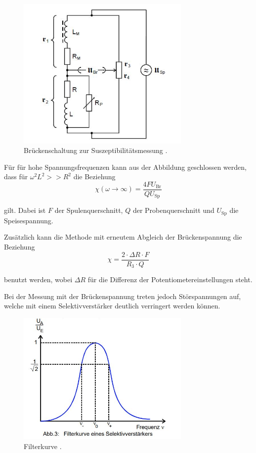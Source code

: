 \begin{figure}[H]
        \centering
        \includegraphics[width=0.75\textwidth]{Bilder/MessBruecke.JPG}
        \caption{Brückenschaltung zur Suszeptibilitätsmessung \cite{V606}.}
        \label{fig:bruecke}
\end{figure}

\noindent
Für für hohe Spannungsfrequenzen kann aus der Abbildung geschlossen werden, dass für $\omega^2 L^2 >> R^2$ die Beziehung 
\begin{equation}
    \chi (\omega \to \infty) = \frac{4 F U_\text{Br}}{Q U_\text{Sp}} 
    \label{eqn:spannung}
\end{equation}

\noindent 
gilt. Dabei ist  $F$ der Spulenquerschnitt, $Q$ der Probenquerschnitt und $U_\text{Sp}$ die Speisespannung.

\noindent
Zusätzlich kann die Methode mit erneutem Abgleich der Brückenspannung die Beziehung 
\begin{equation}
    \chi = \frac{2 \cdot \Delta R \cdot F}{R_3\cdot Q}
    \label{eqn:alternativ}
\end{equation}

\noindent
benutzt werden, wobei $\Delta R$ für die Differenz der Potentiometereinstellungen steht.

\noindent
Bei der Messung mit der Brückenspannung treten jedoch Störspannungen auf, welche mit einem Selektivverstärker deutlich verringert werden können. 
\begin{figure}[H]
        \centering
        \includegraphics[width=0.75\textwidth]{Bilder/Kurve.jpg}
        \caption{Filterkurve \cite{V606}.}
        \label{fig:filterkurve2}
\end{figure}

